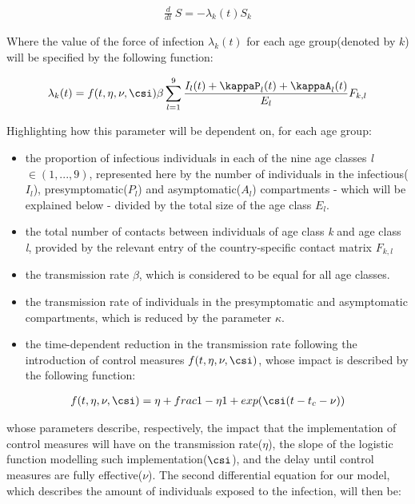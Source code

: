 \documentclass[../main.tex]{subfiles}
\begin{document}
\begin{align}
\frac{d}{dt}~S=-\lambda_{k}(t) S_{k} 
\end{align}

Where the value of the force of infection $\lambda_{k}(t)$ for each age group(denoted by $k$) will be specified by the following function:

\begin{align}
\lambda_{k}(t) = f(t,\eta,\nu,\csi)\beta \sum_{l=1}^{9}\frac{I_{l}(t)+\kappaP_{l}(t)+\kappaA_{l}(t)}{E_{l}}F_{k,l} \end{align}

Highlighting how this parameter will be dependent on, for each age group:
\begin{itemize}
  \item the proportion of infectious individuals in each of the nine age classes  \textit{l} $\in{(1,...,9)}$, represented here by the number of individuals in the infectious($I_{l}$), presymptomatic($P_{l}$) and asymptomatic($A_{l}$) compartments - which will be explained below - divided by the total size of the age class $E_{l}$.
  \item the total number of contacts between individuals of age class \textit{k} and age class \textit{l}, provided by the relevant entry of the country-specific contact matrix $F_{k,l}$
  \item the transmission rate $\beta$, which is considered to be equal for all age classes.
  \item the transmission rate of individuals in the presymptomatic and asymptomatic compartments, which is reduced by the parameter $\kappa$.
  \item the time-dependent reduction in the transmission rate following the introduction of control measures $f(t,\eta,\nu,\csi)$, whose impact is described by the following function:
  
\end{itemize}
\begin{align}
f(t,\eta,\nu,\csi) = \eta + frac{1-\eta}{1+exp(\csi(t-t_{c}-\nu))}
\end{align}

whose parameters describe, respectively, the impact that the implementation of control measures will have on the transmission rate($\eta$), the slope of the logistic function modelling such implementation($\csi$), and the delay until control measures are fully effective($\nu$). The second differential equation for our model, which describes the amount of individuals exposed to the infection, will then be:
\end{document}
